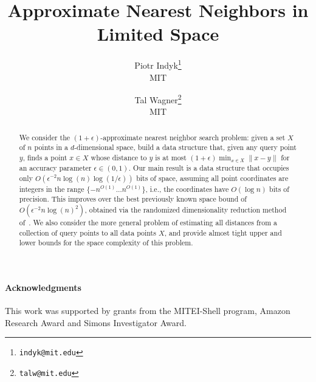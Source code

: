 \documentclass[11pt]{article}
\title{Approximate Nearest Neighbors in Limited  Space}
\author{
  Piotr Indyk\thanks{\texttt{indyk@mit.edu}} \\
  MIT \\
  \and
  Tal Wagner\thanks{\texttt{talw@mit.edu}} \\
  MIT \\
}
\newcommand{\1}{{\rm 1\hspace*{-0.4ex}%

\rule{0.1ex}{1.52ex}\hspace*{0.2ex}}}
\begin{document}
\maketitle

\begin{abstract}
We consider the $(1+\epsilon)$-approximate nearest neighbor search problem: given a set $X$ of $n$ points in a $d$-dimensional space, build a data structure that, given any query point  $y$,  finds a point $x \in X$ whose distance to $y$ is at most $(1+\epsilon) \min_{x \in X} \|x-y\|$ for an accuracy parameter $\epsilon \in (0,1)$.  Our main result is a data structure that occupies only $O(\epsilon^{-2} n \log(n) \log(1/\epsilon))$
bits of space, assuming all point coordinates are integers in the range  $\{-n^{O(1)} \ldots n^{O(1)}\}$, i.e., the coordinates have $O(\log n)$ bits of precision. This improves over the best previously known space bound of         $O(\epsilon^{-2} n \log(n)^2)$, obtained via the randomized dimensionality reduction method of~\cite{johnson1984extensions}.  We also consider the more general problem of estimating all distances from a collection of query points to all data points $X$, and provide almost tight upper and lower bounds for the space complexity of this problem. 
\end{abstract}







\paragraph{Acknowledgments}
This work was supported by grants from the MITEI-Shell program, Amazon Research Award and Simons Investigator Award.




\newpage
\appendix




\end{document}
